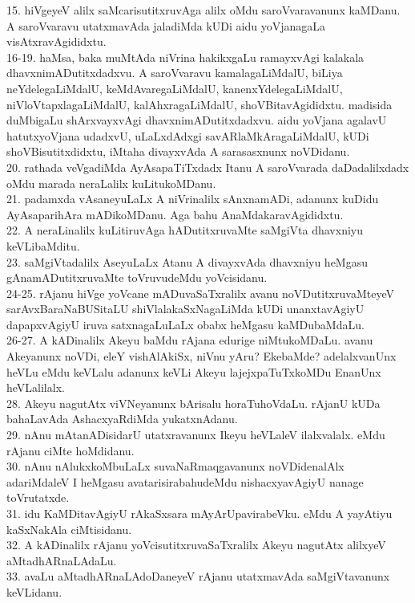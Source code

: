 \documentclass{article}
\begin{document}
15. hiVgeyeV alilx saMcarisutitxruvAga alilx oMdu saroVvaravanunx kaMDanu. A saroVvaravu utatxmavAda jaladiMda kUDi aidu yoVjanagaLa visAtxravAgididxtu.\\
16-19. haMsa, baka muMtAda niVrina hakikxgaLu ramayxvAgi kalakala dhavxnimADutitxdadxvu. A saroVvaravu kamalagaLiMdalU, biLiya neYdelegaLiMdalU, keMdAvaregaLiMdalU, kanenxYdelegaLiMdalU, niVloVtapxlagaLiMdalU, kalAhxragaLiMdalU, shoVBitavAgididxtu. madisida duMbigaLu shArxvayxvAgi dhavxnimADutitxdadxvu. aidu yoVjana agalavU hatutxyoVjana udadxvU, uLaLxdAdxgi savARlaMkAragaLiMdalU, kUDi shoVBisutitxdidxtu, iMtaha divayxvAda A sarasasxnunx noVDidanu.\\
20. rathada veVgadiMda AyAsapaTiTxdadx Itanu A saroVvarada daDadalilxdadx oMdu marada neraLalilx kuLitukoMDanu.\\
21. padamxda vAsaneyuLaLx A niVrinalilx sAnxnamADi, adanunx kuDidu AyAsaparihAra mADikoMDanu. Aga bahu AnaMdakaravAgididxtu.\\
22. A neraLinalilx kuLitiruvAga hADutitxruvaMte saMgiVta dhavxniyu keVLibaMditu.\\
23. saMgiVtadalilx AseyuLaLx Atanu A divayxvAda dhavxniyu heMgasu gAnamADutitxruvaMte toVruvudeMdu yoVcisidanu.\\
24-25. rAjanu hiVge yoVcane mADuvaSaTxralilx avanu noVDutitxruvaMteyeV sarAvxBaraNaBUSitaLU shiVlalakaSxNagaLiMda kUDi unanxtavAgiyU dapapxvAgiyU iruva satxnagaLuLaLx obabx heMgasu kaMDubaMdaLu.\\
26-27. A kADinalilx Akeyu baMdu rAjana edurige niMtukoMDaLu. avanu Akeyanunx noVDi, eleY vishAlAkiSx, niVnu yAru? EkebaMde? adelalxvanUnx heVLu eMdu keVLalu adanunx keVLi Akeyu lajejxpaTuTxkoMDu EnanUnx heVLalilalx.\\
28. Akeyu nagutAtx viVNeyanunx bArisalu horaTuhoVdaLu. rAjanU kUDa bahaLavAda AshacxyaRdiMda yukatxnAdanu.\\
29. nAnu mAtanADisidarU utatxravanunx Ikeyu heVLaleV ilalxvalalx. eMdu rAjanu ciMte hoMdidanu.\\
30. nAnu nAlukxkoMbuLaLx suvaNaRmaqgavanunx noVDidenalAlx adariMdaleV I heMgasu avatarisirabahudeMdu nishacxyavAgiyU nanage toVrutatxde.\\
31. idu KaMDitavAgiyU rAkaSxsara mAyArUpavirabeVku. eMdu A yayAtiyu kaSxNakAla ciMtisidanu.\\
32. A kADinalilx rAjanu yoVcisutitxruvaSaTxralilx Akeyu nagutAtx alilxyeV aMtadhARnaLAdaLu.\\
33. avaLu aMtadhARnaLAdoDaneyeV rAjanu utatxmavAda saMgiVtavanunx keVLidanu.\\
\end{document}
